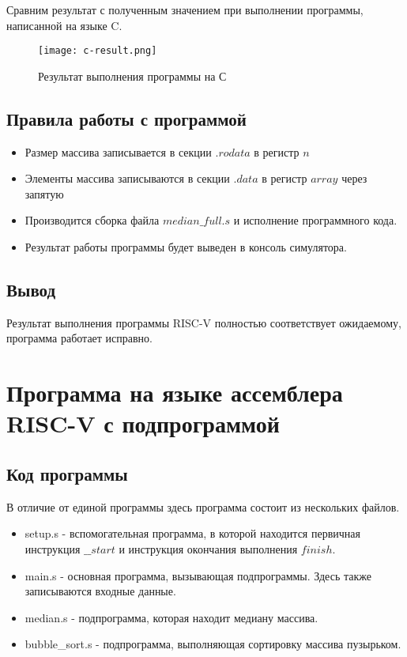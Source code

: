 Сравним результат с полученным значением при выполнении программы, написанной на языке C.

\begin{figure}[H]
	\centering
	\texttt{[image: c-result.png]}
	\caption{Результат выполнения программы на С}
\end{figure}

\subsection{Правила работы с программой}
\begin{itemize}
	\item Размер массива записывается в секции \(.rodata\) в регистр \(n\)
	\item Элементы массива записываются в секции \(.data\) в регистр \(array\) через запятую
	\item Производится сборка файла \(median\_full.s\) и исполнение программного кода.
	\item Результат работы программы будет выведен в консоль симулятора.
\end{itemize}

\subsection{Вывод}
Результат выполнения программы RISC-V полностью соответствует ожидаемому, программа работает исправно.

\newpage

\section{Программа на языке ассемблера RISC-V с подпрограммой}

\subsection{Код программы}
В отличие от единой программы здесь программа состоит из нескольких файлов.
\begin{itemize}
	\item setup.s - вспомогательная программа, в которой находится первичная инструкция \(\_\_start\) и инструкция окончания выполнения \(finish\).
	\item main.s - основная программа, вызывающая подпрограммы. Здесь также записываются входные данные.
	\item median.s - подпрограмма, которая находит медиану массива.
	\item bubble\_sort.s - подпрограмма, выполняющая сортировку массива пузырьком.
\end{itemize}

